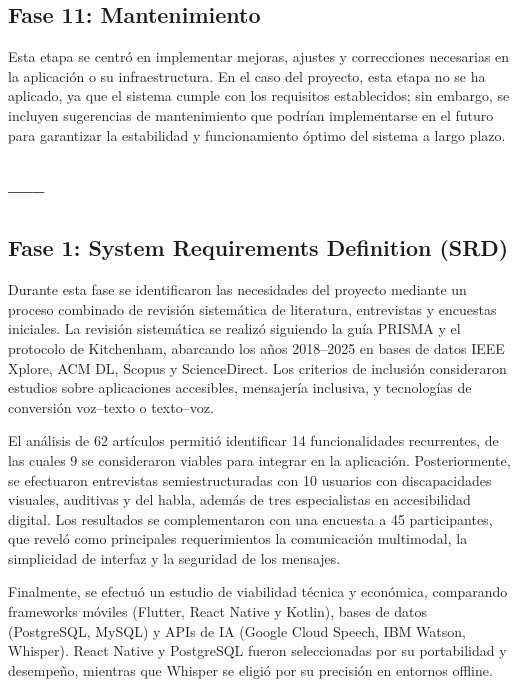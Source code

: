 \documentclass[lettersize,journal]{IEEEtran}
\begin{document}
        \subsection{Fase 11: Mantenimiento}
        
        Esta etapa se centró en implementar mejoras, ajustes y correcciones necesarias en la aplicación o su infraestructura. En el caso del proyecto, esta etapa no se ha aplicado, ya que el sistema cumple con los requisitos establecidos; sin embargo, se incluyen sugerencias de mantenimiento que podrían implementarse en el futuro para garantizar la estabilidad y funcionamiento óptimo del sistema a largo plazo.
        
       	\subsection{-----}
        
        \subsection{Fase 1: System Requirements Definition (SRD)}
        Durante esta fase se identificaron las necesidades del proyecto mediante un proceso combinado de revisión sistemática de literatura, entrevistas y encuestas iniciales.  
        La revisión sistemática se realizó siguiendo la guía PRISMA y el protocolo de Kitchenham, abarcando los años 2018–2025 en bases de datos IEEE Xplore, ACM DL, Scopus y ScienceDirect. Los criterios de inclusión consideraron estudios sobre aplicaciones accesibles, mensajería inclusiva, y tecnologías de conversión voz–texto o texto–voz. 
         
        El análisis de 62 artículos permitió identificar 14 funcionalidades recurrentes, de las cuales 9 se consideraron viables para integrar en la aplicación.  
        Posteriormente, se efectuaron entrevistas semiestructuradas con 10 usuarios con discapacidades visuales, auditivas y del habla, además de tres especialistas en accesibilidad digital. Los resultados se complementaron con una encuesta a 45 participantes, que reveló como principales requerimientos la comunicación multimodal, la simplicidad de interfaz y la seguridad de los mensajes.  
        
        Finalmente, se efectuó un estudio de viabilidad técnica y económica, comparando frameworks móviles (Flutter, React Native y Kotlin), bases de datos (PostgreSQL, MySQL) y APIs de IA (Google Cloud Speech, IBM Watson, Whisper). React Native y PostgreSQL fueron seleccionadas por su portabilidad y desempeño, mientras que Whisper se eligió por su precisión en entornos offline.
        
\end{document}
